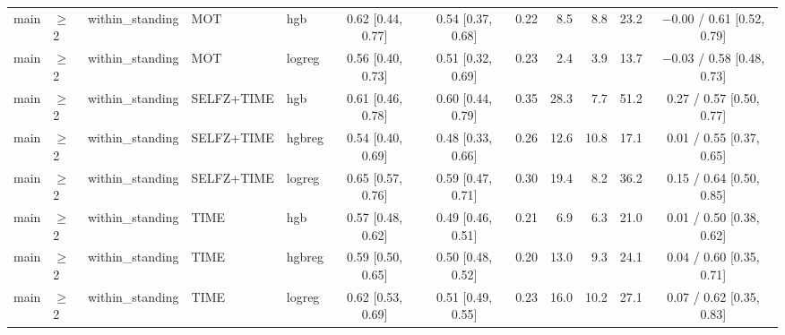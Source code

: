 \begin{longtable}{@{}lllllcccrrrc@{}}
main & $\geq$2 & within\_standing & MOT & hgb & 0.62 [0.44, 0.77] & 0.54 [0.37, 0.68] & 0.22 & 8.5 & 8.8 & 23.2 & $-$0.00 / 0.61 [0.52, 0.79] \\
main & $\geq$2 & within\_standing & MOT & logreg & 0.56 [0.40, 0.73] & 0.51 [0.32, 0.69] & 0.23 & 2.4 & 3.9 & 13.7 & $-$0.03 / 0.58 [0.48, 0.73] \\
main & $\geq$2 & within\_standing & SELFZ+TIME & hgb & 0.61 [0.46, 0.78] & 0.60 [0.44, 0.79] & 0.35 & 28.3 & 7.7 & 51.2 & 0.27 / 0.57 [0.50, 0.77] \\
main & $\geq$2 & within\_standing & SELFZ+TIME & hgbreg & 0.54 [0.40, 0.69] & 0.48 [0.33, 0.66] & 0.26 & 12.6 & 10.8 & 17.1 & 0.01 / 0.55 [0.37, 0.65] \\
main & $\geq$2 & within\_standing & SELFZ+TIME & logreg & 0.65 [0.57, 0.76] & 0.59 [0.47, 0.71] & 0.30 & 19.4 & 8.2 & 36.2 & 0.15 / 0.64 [0.50, 0.85] \\
main & $\geq$2 & within\_standing & TIME & hgb & 0.57 [0.48, 0.62] & 0.49 [0.46, 0.51] & 0.21 & 6.9 & 6.3 & 21.0 & 0.01 / 0.50 [0.38, 0.62] \\
main & $\geq$2 & within\_standing & TIME & hgbreg & 0.59 [0.50, 0.65] & 0.50 [0.48, 0.52] & 0.20 & 13.0 & 9.3 & 24.1 & 0.04 / 0.60 [0.35, 0.71] \\
main & $\geq$2 & within\_standing & TIME & logreg & 0.62 [0.53, 0.69] & 0.51 [0.49, 0.55] & 0.23 & 16.0 & 10.2 & 27.1 & 0.07 / 0.62 [0.35, 0.83] \\
\bottomrule
\end{longtable}